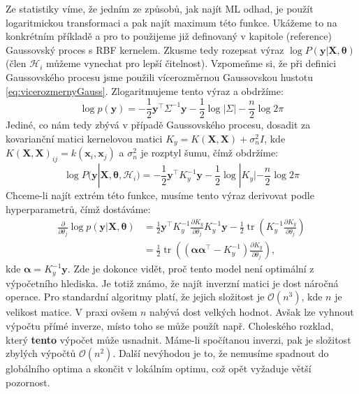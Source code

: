 Ze statistiky víme, že jedním ze způsobů, jak najít ML odhad, je použít logaritmickou transformaci a pak najít maximum této funkce.
Ukážeme to na konkrétním příkladě a pro to použijeme již definovaný v kapitole (reference) Gaussovský proces s RBF kernelem.
Zkusme tedy rozepsat výraz $\log P( \mathbf{y} | \mathbf{X}, \boldsymbol{\theta})$ (člen $\mathcal{H}_i$ můžeme vynechat pro lepší čitelnost).
Vzpomeňme si, že při definici Gaussovského procesu jsme použili vícerozměrnou Gaussovskou hustotu \ref{eq:vicerozmernyGauss}.
Zlogaritmujeme tento výraz a obdržíme:
\begin{equation}
  \log p(\mathbf{y}) = -\frac{1}{2}\mathbf{y}^\top \Sigma^{-1}\mathbf{y} - \frac{1}{2}\log|\Sigma| - \frac{n}{2}\log 2\pi
\end{equation}
Jediné, co nám tedy zbývá v případě Gaussovského procesu, dosadit za kovarianční matici kernelovou matici $K_y = K(\mathbf{X}, \mathbf{X}) + \sigma_n^2 I$, kde $K(\mathbf{X},\mathbf{X})_{ij} = k(\mathbf{x}_i, \mathbf{x}_j)$ a $\sigma_n^2$ je rozptyl šumu, čímž obdržíme:
\begin{equation}
  \log P( \mathbf{y} | \mathbf{X}, \boldsymbol{\theta}, \mathcal{H}_i) = -\frac{1}{2}\mathbf{y}^\top K_y^{-1}\mathbf{y} - \frac{1}{2}\log|K_y| - \frac{n}{2}\log 2\pi
\end{equation}
Chceme-li najít extrém této funkce, musíme tento výraz derivovat podle hyperparametrů, čímž dostáváme:
\begin{align}
  \frac{\partial}{\partial\theta_j} \log p(\mathbf{y}|\mathbf{X}, \boldsymbol{\theta})
    &= \frac{1}{2}\mathbf{y}^\top K_y^{-1}\frac{\partial K_y}{\partial\theta_j}K_y^{-1}\mathbf{y} - \frac{1}{2} \operatorname{tr}\left(K_y^{-1}\frac{\partial K_y}{\partial\theta_j}\right) \nonumber \\
    &= \frac{1}{2} \operatorname{tr}\left(\left(\boldsymbol{\alpha}\boldsymbol{\alpha}^\top - K_y^{-1}\right)\frac{\partial K_y}{\partial\theta_j}\right),
\end{align}
kde $\boldsymbol{\alpha} = K_y^{-1}\mathbf{y}$.
Zde je dokonce vidět, proč tento model není optimální z výpočetního hlediska. 
Je totiž známo, že najít inverzní matici je dost náročná operace.
Pro standardní algoritmy platí, že jejich složitost je $\mathcal{O}(n^3)$, kde $n$ je velikost matice.
V praxi ovšem $n$ nabývá dost velkých hodnot.
Avšak lze vyhnout výpočtu přímé inverze, místo toho se může použít např. Choleského rozklad, který \textbf{tento} výpočet může usnadnit.
Máme-li spočítanou inverzi, pak je složitost zbylých výpočtů $\mathcal{O}(n^2)$.
Další nevýhodou je to, že nemusíme spadnout do globálního optima a skončit v lokálním optimu, což opět vyžaduje větší pozornost.

